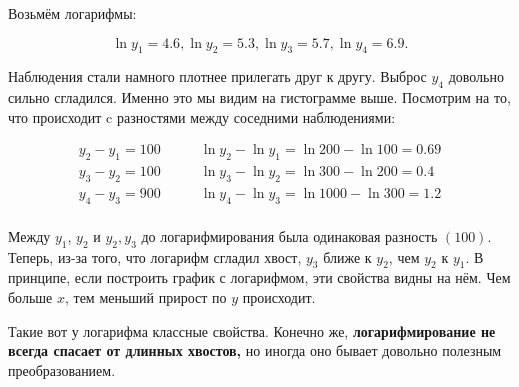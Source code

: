 \documentclass[12pt, a4paper, oneside]{article}
\theoremstyle{plain} %
\theoremstyle{definition}
\newcommand{\indef}[1]{\textbf{ \color{green} #1}}
\begin{document}
\begin{solution}
Возьмём логарифмы: 

$$
\ln y_1 = 4.6 , \ln y_2 = 5.3, \ln y_3 =5.7, \ln y_4 = 6.9.
$$

Наблюдения стали намного плотнее прилегать друг к другу. Выброс $y_4$ довольно сильно сгладился. Именно это мы видим на гистограмме выше. Посмотрим на то, что происходит c разностями между соседними наблюдениями:


\begin{align*}
    y_2 - y_1 = 100 & \qquad \ln y_2 - \ln y_1 = \ln 200 - \ln 100 = 0.69 \\
    y_3 - y_2 = 100 & \qquad \ln y_3 - \ln y_2 = \ln 300 - \ln 200 = 0.4 \\
    y_4 - y_3 = 900 & \qquad \ln y_4 - \ln y_3 = \ln 1000 - \ln 300 = 1.2 \\
\end{align*}

Между $y_1$, $y_2$ и $y_2,y_3$ до логарифмирования была одинаковая разность $(100)$. Теперь, из-за того, что логарифм сгладил хвост, $y_3$ ближе к $y_2$, чем $y_2$ к $y_1$. В принципе, если построить график с логарифмом, эти свойства видны на нём. Чем больше $x$, тем меньший прирост по $y$ происходит.

\begin{center}
\end{center}
	
Такие вот у логарифма классные свойства. Конечно же, \indef{логарифмирование не всегда спасает от длинных хвостов,} но иногда оно бывает довольно полезным преобразованием. 
\end{solution}
\end{document}
